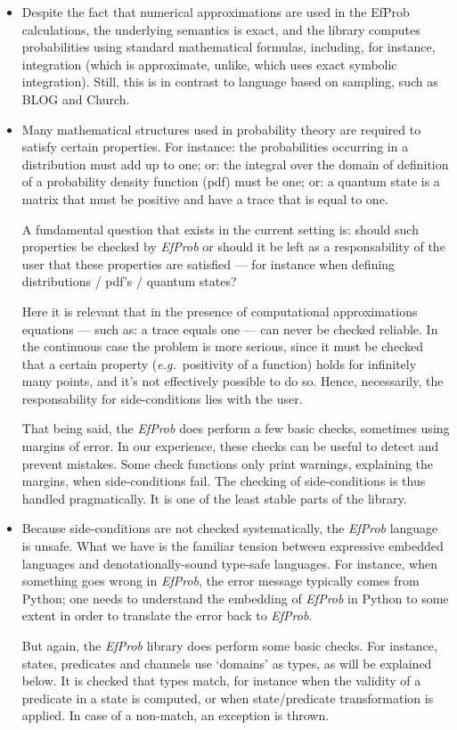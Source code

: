 \documentclass[leqno]{tufte-book} %
\newcommand{\hairsp}{\hspace{1pt}} %
\newcommand{\eg}{\textit{e.\hairsp{}g.}\xspace} %
\newcommand{\EfProb}{\textit{EfProb}\xspace}
\newcommand{\Python}{\textrm{Python}\xspace}
\begin{document}
\begin{itemize}
\item Despite the fact that numerical approximations are used in the
  EfProb calculations, the underlying semantics is exact, and the
  library computes probabilities using standard mathematical formulas,
  including, for instance, integration (which is approximate,
  unlike\cite{GehrMV16}, which uses exact symbolic
  integration). Still, this is in contrast to language based on
  sampling, such as BLOG\cite{MilchMRSOK07} and
  Church\cite{GoodmanMRBT08}.

\item Many mathematical structures used in probability theory are
  required to satisfy certain properties. For instance: the
  probabilities occurring in a distribution must add up to one; or:
  the integral over the domain of definition of a probability density
  function (pdf) must be one; or: a quantum state is a matrix that
  must be positive and have a trace that is equal to one.

A fundamental question that exists in the current setting is: should
such properties be checked by \EfProb or should it be left as a
responsability of the user that these properties are satisfied --- for
instance when defining distributions / pdf's / quantum states?

Here it is relevant that in the presence of computational
approximations equations --- such as: a trace equals one --- can never
be checked reliable. In the continuous case the problem is more
serious, since it must be checked that a certain property
(\eg~positivity of a function) holds for infinitely many points, and
it's not effectively possible to do so. Hence, necessarily, the
responsability for side-conditions lies with the user.

That being said, the \EfProb does perform a few basic checks,
sometimes using margins of error. In our experience, these checks can
be useful to detect and prevent mistakes. Some check functions only
print warnings, explaining the margins, when side-conditions fail. The
checking of side-conditions is thus handled pragmatically. It is one
of the least stable parts of the library.

\item Because side-conditions are not checked systematically, the
  \EfProb language is unsafe. What we have is the familiar tension
  between expressive embedded languages and denotationally-sound
  type-safe languages. For instance, when something goes wrong in
  \EfProb, the error message typically comes from \Python; one needs
  to understand the embedding of \EfProb in \Python to some extent in
  order to translate the error back to \EfProb.

But again, the \EfProb library does perform some basic checks. For
instance, states, predicates and channels use `domains' as types, as
will be explained below. It is checked that types match, for instance
when the validity of a predicate in a state is computed, or when
state/predicate transformation is applied. In case of a non-match, an
exception is thrown.
\end{itemize}
\end{document}
